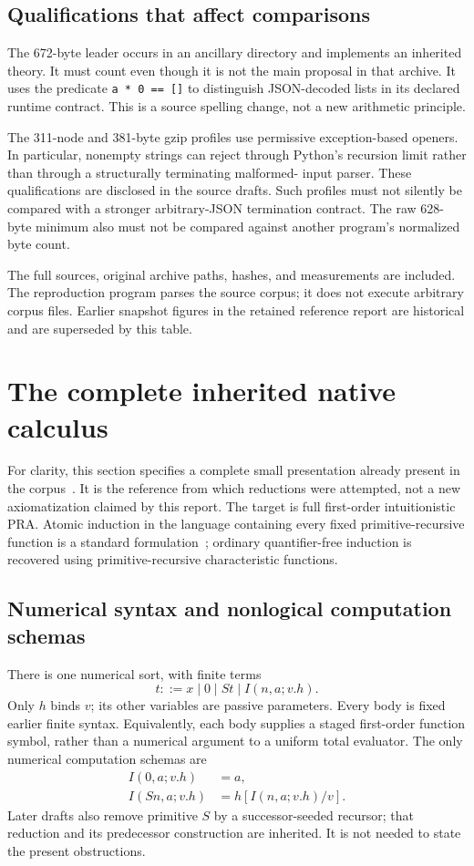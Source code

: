 \documentclass[11pt]{article}
\newcommand{\file}[1]{\texttt{\nolinkurl{#1}}}
\begin{document}
\subsection{Qualifications that affect comparisons}

The 672-byte leader occurs in an ancillary directory and implements an
inherited theory. It must count even though it is not the main proposal in
that archive. It uses the predicate \file{a * 0 == []} to distinguish
JSON-decoded lists in its declared runtime contract. This is a source
spelling change, not a new arithmetic principle.

The 311-node and 381-byte gzip profiles use permissive exception-based
openers. In particular, nonempty strings can reject through Python's
recursion limit rather than through a structurally terminating malformed-
input parser. These qualifications are disclosed in the source drafts.
Such profiles must not silently be compared with a stronger arbitrary-JSON
termination contract. The raw 628-byte minimum also must not be compared
against another program's normalized byte count.

The full sources, original archive paths, hashes, and measurements are
included. The reproduction program parses the source corpus; it does not
execute arbitrary corpus files. Earlier snapshot figures in the retained
reference report are historical and are superseded by this table.

\section{The complete inherited native calculus}
\label{sec:calculus}

For clarity, this section specifies a complete small presentation already
present in the corpus~\cite{constructed,flat}. It is the reference from
which reductions were attempted, not a new axiomatization claimed by this
report. The target is full first-order intuitionistic PRA. Atomic induction
in the language containing every fixed primitive-recursive function is a
standard formulation~\cite{salehi}; ordinary quantifier-free induction is
recovered using primitive-recursive characteristic functions.

\subsection{Numerical syntax and nonlogical computation schemas}

There is one numerical sort, with finite terms
\[
 t ::= x\mid0\mid St\mid I(n,a;v.h).
\]
Only $h$ binds $v$; its other variables are passive parameters. Every body
is fixed earlier finite syntax. Equivalently, each body supplies a staged
first-order function symbol, rather than a numerical argument to a
uniform total evaluator. The only numerical computation schemas are
\begin{align}
 I(0,a;v.h)&=a,\tag{I0}\label{eq:I0}\\
 I(Sn,a;v.h)&=h[I(n,a;v.h)/v].\tag{IS}\label{eq:IS}
\end{align}
Later drafts also remove primitive $S$ by a successor-seeded recursor;
that reduction and its predecessor construction are inherited. It is not
needed to state the present obstructions.
\end{document}
